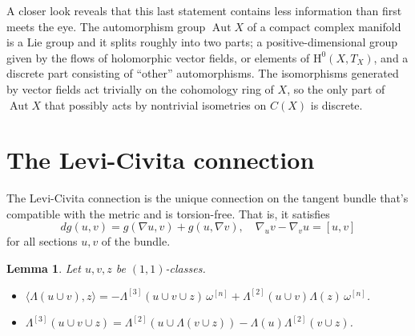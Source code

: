 \documentclass[11pt,a4paper]{amsart}
\newtheorem{lemm}[theo]{Lemma}
\theoremstyle{definition}
\theoremstyle{remark}
\newcommand{\Aut}{\mathop{\mathrm{Aut}}}
\def\coho#1{\mathrm{H}^{#1}}
\def\levi{\nabla}
\def\kf{\omega}
\def\Lef{\Lambda}
\def\ton{u}
\def\ttw{v}
\def\tth{z}
\def\^#1{^{[#1]}}
\def\KC{C}
\begin{document}
A closer look reveals that this last statement contains less information
than first meets the eye. The automorphism group $\Aut X$ of a compact
complex manifold is a Lie group and it splits roughly into two parts; a
positive-dimensional group given by the flows of holomorphic vector
fields, or elements of $\coho{0}(X,T_X)$, and a discrete part consisting of
``other'' automorphisms. The isomorphisms generated by vector fields act
trivially on the cohomology ring of $X$, so the only part of $\Aut X$
that possibly acts by nontrivial isometries on $\KC(X)$ is discrete.





\section{The Levi-Civita connection}

The Levi-Civita connection is the unique connection on the tangent
bundle that's compatible with the metric and is torsion-free. That is,
it satisfies
$$
d g(\ton, \ttw) 
= g(\levi \ton, \ttw) + g(\ton, \levi \ttw),
\quad
\levi_{\ton}\ttw - \levi_{\ttw}\ton = [\ton,\ttw]
$$
for all sections $\ton, \ttw$ of the bundle.

\begin{lemm}
Let $\ton,\ttw,\tth$ be $(1,1)$-classes. 
\begin{itemize}
    \item
$\langle \Lef(\ton\cup\ttw), \tth \rangle
= - \Lef\^3(\ton \cup \ttw \cup \tth) \,\kf\^n
+ \Lef\^2(\ton \cup \ttw) \Lef(\tth) \,\kf\^n$.
    \item 
$\Lef\^3(\ton \cup \ttw \cup \tth)
= \Lef\^2(\ton \cup \Lef(\ttw \cup \tth))
- \Lef(\ton) \Lef\^2(\ttw \cup \tth)$.
\end{itemize}
\end{lemm}
\end{document}
